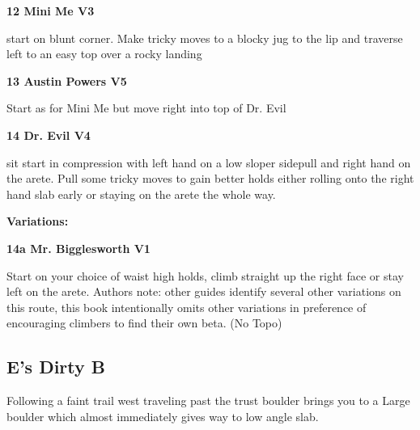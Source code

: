 \begin{multicols}{2}
					\label{rt:Mini Me}
\colorbox{green!20}{
\parbox{0.95\linewidth}{
\textbf{
12 Mini Me V3  
}
}
}

					\begin{adjustwidth}{0.5cm}{}				
					start on blunt corner. Make tricky moves to a blocky jug to the lip and traverse left to an easy top over a rocky landing
					\end{adjustwidth}
					\label{rt:Austin Powers}
\colorbox{RoyalBlue!20}{
\parbox{0.95\linewidth}{
\textbf{
13 Austin Powers V5    
}
}
}

					\begin{adjustwidth}{0.5cm}{}				
					Start as for Mini Me but move right into top of Dr. Evil
					\end{adjustwidth}

					\label{rt:Dr. Evil}
\colorbox{RoyalBlue!20}{
\parbox{0.95\linewidth}{
\textbf{
14 Dr. Evil V4    
}
}
}

					\begin{adjustwidth}{0.5cm}{}				
					sit start in compression with left hand on a low sloper sidepull and right hand on the arete. Pull some tricky moves to gain better holds either rolling onto the right hand slab early or staying on the arete the whole way.
					\end{adjustwidth}
						\begin{adjustwidth}{0.5cm}{}				
						\textbf{Variations:} \newline
							\label{vr:Mr. Bigglesworth}
\colorbox{green!20}{
\parbox{0.95\linewidth}{
\textbf{
14a Mr. Bigglesworth V1    
}
}
}

							\begin{adjustwidth}{0.5cm}{}				
							Start on your choice of waist high holds, climb straight up the right face or stay left on the arete. Authors note: other guides identify several other variations on this route, this book intentionally omits other variations in preference of encouraging climbers to find their own beta.
								\newline (No Topo) 
							\end{adjustwidth}
						\end{adjustwidth}
			\subsection*{E's Dirty B}\label{bf:E's Dirty B}
			Following a faint trail west traveling past the trust boulder brings you to a Large boulder which almost immediately gives way to low angle slab.\\
			

\end{multicols}

